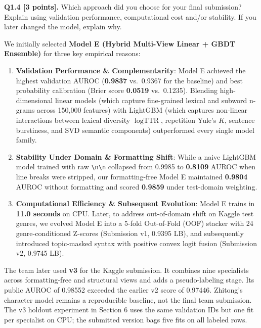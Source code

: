\documentclass[11pt,letterpaper]{article}
\begin{document}
\vspace{6pt}
\textbf{Q1.4 [3 points].} Which approach did you choose for your final submission? Explain using validation performance, computational cost and/or stability. If you later changed the model, explain why.

We initially selected \textbf{Model E (Hybrid Multi-View Linear + GBDT Ensemble)} for three key empirical reasons:
\begin{enumerate}[leftmargin=*,itemsep=1pt,topsep=2pt]
    \item \textbf{Validation Performance \& Complementarity}: Model E achieved the highest validation AUROC (\textbf{0.9837} vs.\ 0.9367 for the baseline) and best probability calibration (Brier score \textbf{0.0519} vs.\ 0.1235). Blending high-dimensional linear models (which capture fine-grained lexical and subword n-grams across 150,000 features) with LightGBM (which captures non-linear interactions between lexical diversity $\log\text{TTR}$, repetition Yule's $K$, sentence burstiness, and SVD semantic components) outperformed every single model family.
    \item \textbf{Stability Under Domain \& Formatting Shift}: While a naive LightGBM model trained with raw \texttt{\textbackslash n\textbackslash n} collapsed from 0.9985 to \textbf{0.8109} AUROC when line breaks were stripped, our formatting-free Model E maintained \textbf{0.9804} AUROC without formatting and scored \textbf{0.9859} under test-domain weighting.
    \item \textbf{Computational Efficiency \& Subsequent Evolution}: Model E trains in \textbf{11.0 seconds} on CPU. Later, to address out-of-domain shift on Kaggle test genres, we evolved Model E into a 5-fold Out-of-Fold (OOF) stacker with 24 genre-conditioned Z-scores (Submission v1, 0.9395 LB), and subsequently introduced topic-masked syntax with positive convex logit fusion (Submission v2, 0.9745 LB).
\end{enumerate}

The team later used \textbf{v3} for the Kaggle submission. It combines nine specialists across formatting-free and structural views and adds a pseudo-labeling stage. Its public AUROC of 0.98552 exceeded the earlier v2 score of 0.97446. Zhitong's character model remains a reproducible baseline, not the final team submission. The v3 holdout experiment in Section 6 uses the same validation IDs but one fit per specialist on CPU; the submitted version bags five fits on all labeled rows.

\newpage
\end{document}
